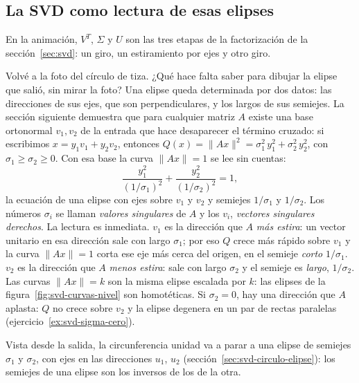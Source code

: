 \subsection{La SVD como lectura de esas elipses}\label{sec:svd-idea}



En la animación, \(V^T\), \(\Sigma\) y \(U\) son las tres etapas de la factorización de la
sección~\ref{sec:svd}: un giro, un estiramiento por ejes y otro giro.

Volvé a la foto del círculo de tiza.
¿Qué hace falta saber para dibujar la elipse que salió, sin mirar la foto?
Una elipse queda determinada por dos datos: las direcciones de sus ejes, que son
perpendiculares, y los largos de sus semiejes. La sección siguiente demuestra que para
cualquier matriz \(A\) existe una base ortonormal \(v_1,v_2\) de la entrada que hace
desaparecer el término cruzado: si escribimos \(x=y_1v_1+y_2v_2\), entonces
\(Q(x)=\|Ax\|^2=\sigma_1^2\,y_1^2+\sigma_2^2\,y_2^2\), con \(\sigma_1\ge\sigma_2\ge0\). Con
esa base la curva \(\|Ax\|=1\) se lee sin cuentas:
\[
  \frac{y_1^2}{(1/\sigma_1)^2}+\frac{y_2^2}{(1/\sigma_2)^2}=1 ,
\]
la ecuación de una elipse con ejes sobre \(v_1\) y \(v_2\) y semiejes \(1/\sigma_1\) y
\(1/\sigma_2\). Los números \(\sigma_i\) se llaman \emph{valores singulares} de \(A\) y los
\(v_i\), \emph{vectores singulares derechos}. La lectura es inmediata. \(v_1\) es la dirección
que \(A\) \emph{más estira}: un vector unitario en esa dirección sale con largo \(\sigma_1\);
por eso \(Q\) crece más rápido sobre \(v_1\) y la curva \(\|Ax\|=1\) corta ese eje más cerca
del origen, en el semieje \emph{corto} \(1/\sigma_1\). \(v_2\) es la dirección que \(A\)
\emph{menos estira}: sale con largo \(\sigma_2\) y el semieje es \emph{largo}, \(1/\sigma_2\).
Las curvas \(\|Ax\|=k\) son la misma elipse escalada por \(k\): las elipses de la
figura~\ref{fig:svd-curvas-nivel} son homotéticas. Si \(\sigma_2=0\), hay una dirección que
\(A\) aplasta: \(Q\) no crece sobre \(v_2\) y la elipse degenera en un par de rectas
paralelas (ejercicio~\ref{ex:svd-sigma-cero}).

Vista desde la salida, la circunferencia unidad va a parar a una elipse de semiejes
\(\sigma_1\) y \(\sigma_2\), con ejes en las direcciones \(u_1\), \(u_2\)
(sección~\ref{sec:svd-circulo-elipse}): los semiejes de una elipse son los inversos de los de
la otra.

